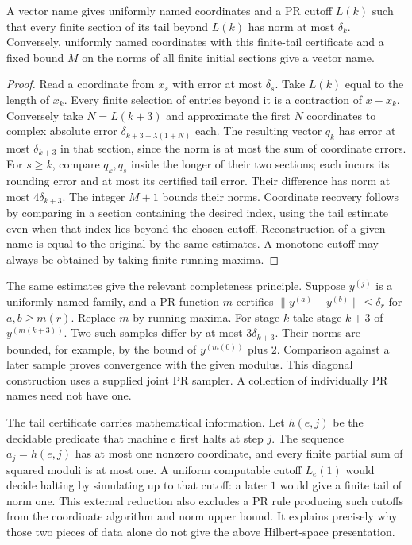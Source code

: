 \begin{proposition}
A vector name gives uniformly named coordinates and a PR cutoff $L(k)$
such that every finite section of its tail beyond $L(k)$ has norm at
most $\delta_k$. Conversely, uniformly named coordinates with this
finite-tail certificate and a fixed bound $M$ on the norms of all finite
initial sections give a vector name.
\end{proposition}
\begin{proof}
Read a coordinate from $x_s$ with error at most $\delta_s$. Take $L(k)$
equal to the length of $x_k$. Every finite selection of entries beyond it
is a contraction of $x-x_k$. Conversely take $N=L(k+3)$ and approximate the
first $N$ coordinates to complex absolute error
$\delta_{k+3+\lambda(1+N)}$ each. The resulting vector $q_k$ has error at
most $\delta_{k+3}$ in that section, since the norm is at most the sum
of coordinate errors. For $s\ge k$, compare $q_k,q_s$ inside the longer
of their two sections; each incurs its rounding error and at most its
certified tail error. Their difference has norm at most $4\delta_{k+3}$.
The integer $M+1$ bounds their norms. Coordinate recovery follows by
comparing in a section containing the desired index, using the tail estimate
even when that index lies beyond the chosen cutoff. Reconstruction of a
given name is equal to the original by the same estimates. A monotone
cutoff may always be obtained by taking finite running maxima.
\end{proof}

The same estimates give the relevant completeness principle. Suppose
$y^{(j)}$ is a uniformly named family, and a PR function $m$ certifies
$\|y^{(a)}-y^{(b)}\|\le\delta_r$ for $a,b\ge m(r)$.
Replace $m$ by running maxima. For stage $k$ take stage $k+3$ of
$y^{(m(k+3))}$. Two such samples differ by at most $3\delta_{k+3}$.
Their norms are bounded, for example, by the bound of $y^{(m(0))}$
plus $2$. Comparison against a later sample proves convergence with the
given modulus. This diagonal construction uses a supplied joint PR sampler.
A collection of individually PR names need not have one.

The tail certificate carries mathematical information. Let $h(e,j)$ be the
decidable predicate that machine $e$ first halts at step $j$. The sequence
$a_j=h(e,j)$ has at most one nonzero coordinate, and every finite partial
sum of squared moduli is at most one. A uniform computable cutoff $L_e(1)$
would decide halting by simulating up to that cutoff: a later $1$ would give
a finite tail of norm one. This external reduction also excludes a PR rule
producing such cutoffs from the coordinate algorithm and norm upper bound.
It explains precisely why those two pieces of data alone do not give the
above Hilbert-space presentation.

